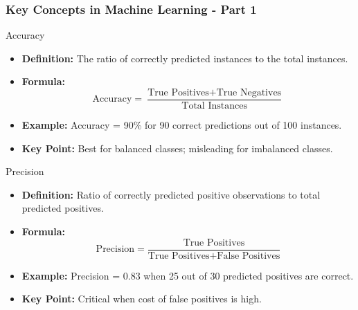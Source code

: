 \documentclass[aspectratio=169]{beamer}
\begin{document}
\begin{frame}[fragile]
    \frametitle{Key Concepts in Machine Learning - Part 1}
    
    \begin{block}{Accuracy}
        \begin{itemize}
            \item \textbf{Definition:} The ratio of correctly predicted instances to the total instances.
            \item \textbf{Formula:} 
            \begin{equation}
                \text{Accuracy} = \frac{\text{True Positives} + \text{True Negatives}}{\text{Total Instances}}
            \end{equation}
            \item \textbf{Example:} Accuracy = 90\% for 90 correct predictions out of 100 instances.
            \item \textbf{Key Point:} Best for balanced classes; misleading for imbalanced classes.
        \end{itemize}
    \end{block}
    
    \vspace{1cm}
    
    \begin{block}{Precision}
        \begin{itemize}
            \item \textbf{Definition:} Ratio of correctly predicted positive observations to total predicted positives.
            \item \textbf{Formula:} 
            \begin{equation}
                \text{Precision} = \frac{\text{True Positives}}{\text{True Positives} + \text{False Positives}}
            \end{equation}
            \item \textbf{Example:} Precision = 0.83 when 25 out of 30 predicted positives are correct.
            \item \textbf{Key Point:} Critical when cost of false positives is high.
        \end{itemize}
    \end{block}
\end{frame}
\end{document}
